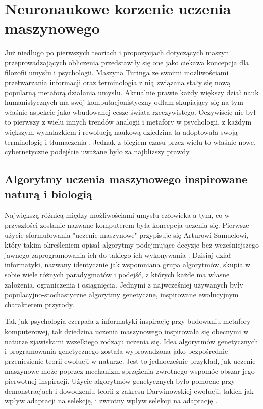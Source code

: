 \chapter{Neuronaukowe korzenie uczenia maszynowego}
\label{chapter1}

Już niedługo po pierwszych teoriach i propozycjach dotyczących maszyn przeprowadzających obliczenia przedstawiły się one jako ciekawa koncepcja dla filozofii umysłu i psychologii.
Maszyna Turinga ze swoimi możliwościami przetwarzania informacji oraz terminologia z nią związana stały się nową popularną metaforą działania umysłu.
Aktualnie prawie każdy większy dział nauk humanistycznych ma swój komputacjonistyczny odłam skupiający się na tym właśnie aspekcie jako wbudowanej cesze świata rzeczywistego.
Oczywiście nie był to pierwszy z wielu innych trendów analogii i metafory w psychologii, z każdym większym wynalazkiem i rewolucją naukową dziedzina ta adoptowała swoją terminologię i tłumaczenia \cite{vroon1987man}.
Jednak z biegiem czasu przez wielu to właśnie nowe, cybernetyczne podejście uważane było za najbliższy prawdy.

\section{Algorytmy uczenia maszynowego inspirowane naturą i biologią}

Największą różnicą między możliwościami umysłu człowieka a tym, co w przyszłości zostanie nazwane komputerem była koncepcja uczenia się.
Pierwsze użycie sformułowania "uczenie maszynowe" przypisuje się Arturowi Samuelowi, który takim określeniem opisał algorytmy podejmujące decyzje bez wcześniejszego jawnego zaprogramowania ich do takiego ich wykonywania \cite{koza1996automated}.
Dzisiaj dział informatyki, nazwany identycznie jak wspomniana grupa algorytmów, skupia w sobie wiele różnych paradygmatów i podejść, z których każde ma własne założenia, ograniczenia i osiągnięcia.
Jednymi z najwcześniej używanych były populacyjno-stochastyczne algorytmy genetyczne, inspirowane ewolucyjnym charakterem przyrody.

Tak jak psychologia czerpała z informatyki inspirację przy budowaniu metafory komputerowej, tak dziedzina uczenia maszynowego inspirowała się obecnymi w naturze zjawiskami wszelkiego rodzaju uczenia się.
Idea algorytmów genetycznych i programowania genetycznego została wyprowadzona jako bezpośrednie przeniesienie teorii ewolucji w naturze.
Jest to jednocześnie przykład, jak uczenie maszynowe może poprzez mechanizm sprzężenia zwrotnego wspomóc obszar jego pierwotnej inspiracji.
Użycie algorytmów genetycznych było pomocne przy demonstracjach i dowodzeniu teorii z zakresu Darwinowskiej ewolucji, takich jak wpływ adaptacji na selekcję, i zwrotny wpływ selekcji na adaptację \cite{bruderer1996organizational}.


